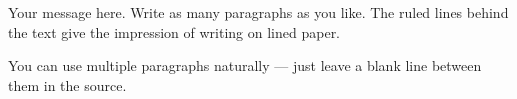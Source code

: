\documentclass[a5paper, 12pt]{article}
\begin{document}

Your message here. Write as many paragraphs as you like. The ruled lines
behind the text give the impression of writing on lined paper.

You can use multiple paragraphs naturally --- just leave a blank line
between them in the source.

\end{document}
